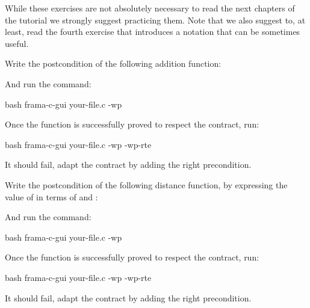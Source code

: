 




While these exercises are not absolutely necessary to read the next chapters
of the tutorial we strongly suggest practicing them. Note that we also
suggest to, at least, read the fourth exercise that introduces a notation
that can be sometimes useful.





Write the postcondition of the following addition function:




And run the command:


\begin{CodeBlock}{bash}
frama-c-gui your-file.c -wp
\end{CodeBlock}


Once the function is successfully proved to respect the contract, run:


\begin{CodeBlock}{bash}
frama-c-gui your-file.c -wp -wp-rte
\end{CodeBlock}


It should fail, adapt the contract by adding the right precondition.




Write the postcondition of the following distance function, by expressing
the value of  in terms of  and
:




And run the command:


\begin{CodeBlock}{bash}
frama-c-gui your-file.c -wp
\end{CodeBlock}


Once the function is successfully proved to respect the contract, run:


\begin{CodeBlock}{bash}
frama-c-gui your-file.c -wp -wp-rte
\end{CodeBlock}


It should fail, adapt the contract by adding the right precondition.






